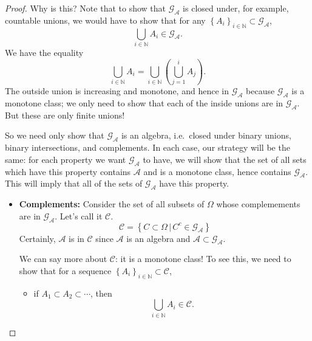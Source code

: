 \documentclass[a4paper,12pt]{scrreprt}
\newcommand{\N}{\mathbb{N}}
\theoremstyle{definition}
\theoremstyle{plain}
\theoremstyle{remark}
\begin{document}
\begin{proof}
  Why is this? Note that to show that $\mathcal{G}_{\mathcal{A}}$ is closed under, for example, countable unions, we would have to show that for any ${\left\{ A_{i} \right\}}_{i \in \N} \subset \mathcal{G}_{\mathcal{A}}$,
  \begin{equation*}
    \bigcup_{i \in \N} A_{i} \in \mathcal{G}_{\mathcal{A}}.
  \end{equation*}
  We have the equality
  \begin{equation*}
    \bigcup_{i \in \N} A_{i} = \bigcup_{i \in \N}\left( \bigcup_{j=1}^{i} A_{j} \right).
  \end{equation*}
  The outside union is increasing and monotone, and hence in $\mathcal{G}_{\mathcal{A}}$ because $\mathcal{G}_{\mathcal{A}}$ is a monotone class; we only need to show that each of the inside unions are in $\mathcal{G}_{\mathcal{A}}$. But these are only finite unions!

  So we need only show that $\mathcal{G}_{\mathcal{A}}$ is an algebra, i.e.\ closed under binary unions, binary intersections, and complements. In each case, our strategy will be the same: for each property we want $\mathcal{G}_{\mathcal{A}}$ to have, we will show that the set of all sets which have this property contains $\mathcal{A}$ and is a monotone class, hence contains $\mathcal{G}_{\mathcal{A}}$. This will imply that all of the sets of $\mathcal{G}_{\mathcal{A}}$ have this property.
  \begin{itemize}
    \item \textbf{Complements:} Consider the set of all subsets of $\Omega$ whose complemements are in $\mathcal{G}_{\mathcal{A}}$. Let's call it $\mathcal{C}$.
      \begin{equation*}
        \mathcal{C} = \left\{ C \subset \Omega\,\big|\, C^{c} \in \mathcal{G}_{\mathcal{A}} \right\}
      \end{equation*}
      Certainly, $\mathcal{A}$ is in $\mathcal{C}$ since $\mathcal{A}$ is an algebra and $\mathcal{A} \subset \mathcal{G}_{\mathcal{A}}$.

      We can say more about $\mathcal{C}$: it is a monotone class! To see this, we need to show that for a sequence ${\left\{ A_{i} \right\}}_{i \in \N} \subset \mathcal{C}$,
      \begin{itemize}
        \item if $A_{1} \subset A_{2} \subset \cdots$, then
          \begin{equation*}
            \bigcup_{i \in \N} A_{i} \in \mathcal{C}.
          \end{equation*}


\end{itemize}
\end{itemize}
\end{proof}
\end{document}

